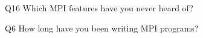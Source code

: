 \begin{description}%
\item{Q16} Which MPI features have you never heard of?%
\item{Q6} How long have you been writing MPI programs?%
\end{description}%
